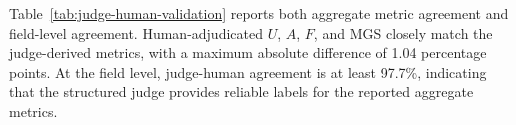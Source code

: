 Table~\ref{tab:judge-human-validation} reports both aggregate metric agreement and field-level agreement. 
Human-adjudicated $U$, $A$, $F$, and MGS closely match the judge-derived metrics, with a maximum absolute difference of 1.04 percentage points. 
At the field level, judge-human agreement is at least 97.7\%, indicating that the structured judge provides reliable labels for the reported aggregate metrics.